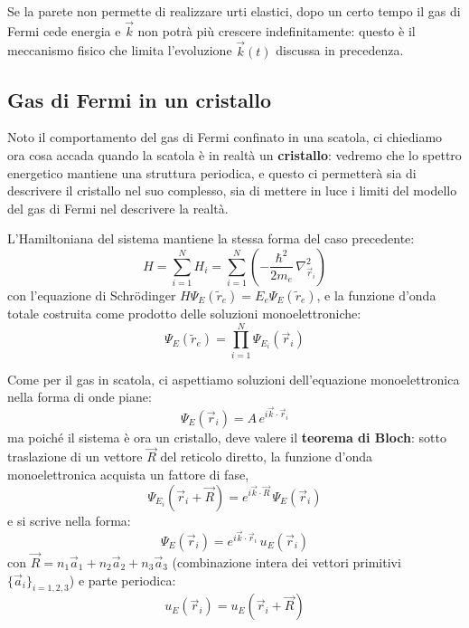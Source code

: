 Se la parete non permette di realizzare urti elastici, dopo un certo tempo il gas di Fermi cede energia e \(\vec{k}\) non potrà più crescere indefinitamente: questo è il meccanismo fisico che limita l'evoluzione \(\vec{k}(t)\) discussa in precedenza.

\subsection{Gas di Fermi in un cristallo}

Noto il comportamento del gas di Fermi confinato in una scatola, ci chiediamo ora cosa accada quando la scatola è in realtà un \textbf{cristallo}: vedremo che lo spettro energetico mantiene una struttura periodica, e questo ci permetterà sia di descrivere il cristallo nel suo complesso, sia di mettere in luce i limiti del modello del gas di Fermi nel descrivere la realtà.

L'Hamiltoniana del sistema mantiene la stessa forma del caso precedente:
\begin{equation}
    H = \sum_{i=1}^{N} H_i = \sum_{i=1}^{N} \left( -\frac{\hbar^2}{2 m_e}\, \nabla^2_{\vec{r}_i} \right)
\end{equation}
con l'equazione di Schrödinger \(H \Psi_E(\tilde{r}_e) = E_e \Psi_E(\tilde{r}_e)\), e la funzione d'onda totale costruita come prodotto delle soluzioni monoelettroniche:
\begin{equation}
    \Psi_E(\tilde{r}_e) = \prod_{i=1}^{N} \Psi_{E_i}(\vec{r}_i)
\end{equation}

Come per il gas in scatola, ci aspettiamo soluzioni dell'equazione monoelettronica nella forma di onde piane:
\begin{equation}
    \Psi_E(\vec{r}_i) = A\, e^{i \vec{k} \cdot \vec{r}_i}
\end{equation}
ma poiché il sistema è ora un cristallo, deve valere il \textbf{teorema di Bloch}: sotto traslazione di un vettore \(\vec{R}\) del reticolo diretto, la funzione d'onda monoelettronica acquista un fattore di fase,
\begin{equation}
    \Psi_{E_i}(\vec{r}_i + \vec{R}) = e^{i \vec{k} \cdot \vec{R}}\, \Psi_E(\vec{r}_i)
\end{equation}
e si scrive nella forma:
\begin{equation}
    \Psi_E(\vec{r}_i) = e^{i \vec{k} \cdot \vec{r}_i}\, u_E(\vec{r}_i)
\end{equation}
con \(\vec{R} = n_1 \vec{a}_1 + n_2 \vec{a}_2 + n_3 \vec{a}_3\) (combinazione intera dei vettori primitivi \(\{\vec{a}_i\}_{i=1,2,3}\)) e parte periodica:
\begin{equation}
    u_E(\vec{r}_i) = u_E(\vec{r}_i + \vec{R})
\end{equation}

